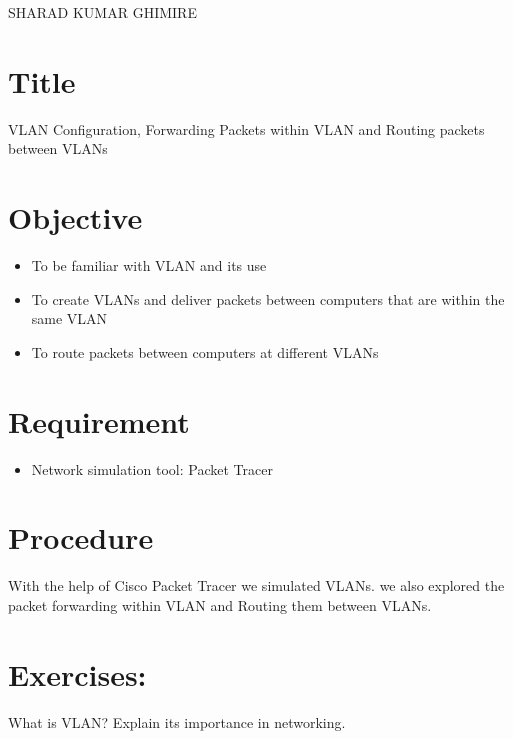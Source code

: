 \documentclass[a4paper,11pt]{article}
\begin{document}
{SHARAD KUMAR GHIMIRE}

\renewcommand{\contentsname}{Table of Contents}
\tableofcontents

\pagebreak
\lstlistoflistings
\pagebreak
\listoffigures
\pagebreak
{}

\section{Title} {\large VLAN Configuration, Forwarding Packets within VLAN and Routing
  packets between VLANs}
\section{Objective}
\begin{itemize}
    \item To be familiar with VLAN and its use
    \item To create VLANs and deliver packets between computers that are within the same VLAN
    \item To route packets between computers at different VLANs
\end{itemize}
\section{Requirement}
\begin{itemize}
    \item Network simulation tool: Packet Tracer
\end{itemize}

\section{Procedure}

With the help of Cisco Packet Tracer we simulated VLANs. we also explored the packet forwarding within VLAN and Routing them between VLANs.

\pagebreak
\section{Exercises:}

\begin{Q}
    {
        What is VLAN? Explain its importance in networking.
    }
\end{Q}
\end{document}
